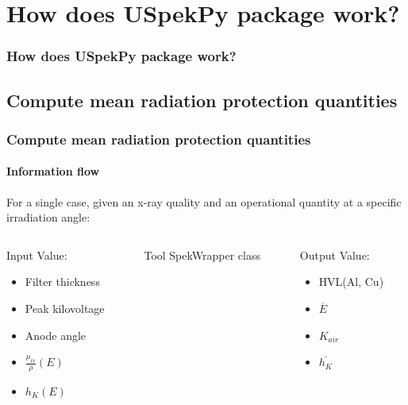 \documentclass{beamer}
\newcommand{\highlight}[1]{{\color{blue} #1}}
\begin{document}
	\section{How does USpekPy package work?}
	
	\begin{frame}
		\frametitle{How does USpekPy package work?}
		\tableofcontents[
		currentsection,
		sectionstyle=show/shaded,
		subsectionstyle=show/show/hide
		]
	\end{frame}
	
	\subsection{Compute mean radiation protection quantities}
	
	\begin{frame}
		\frametitle{Compute mean radiation protection quantities}
		\framesubtitle{Information flow}
		For a \highlight{single case}, given an x-ray quality and an operational quantity at a specific irradiation angle:
		\begin{columns}[t]
			\begin{column}{0.3\textwidth}
				\begin{block}{Input}
					Value:
					\begin{itemize}
						\item Filter thickness
						\item Peak kilovoltage
						\item Anode angle
						\item $\frac{\mu_{tr}}{\rho}(E)$
						\item $h_K(E)$
					\end{itemize}
				\end{block}
			\end{column}
			\begin{column}{0.3\textwidth}
				\begin{block}{Tool}
					SpekWrapper class
				\end{block}
			\end{column}
			\begin{column}{0.3\textwidth}
				\begin{block}{Output}
					Value:
					\begin{itemize}
						\item HVL(Al, Cu)
						\item $\overline{E}$
						\item $K_{air}$
						\item $\overline{h_K}$
					\end{itemize}
				\end{block}
			\end{column}
		\end{columns}
	\end{frame}
	
\end{document}
